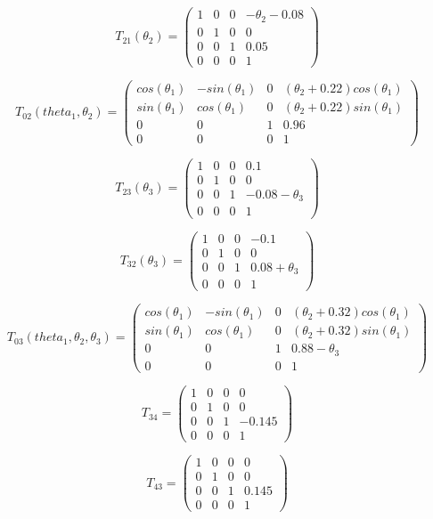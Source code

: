 \documentclass[]{scrreprt}
\begin{document}
\[
T_{21}(\theta_2) = \left(\begin{array}{cccc}
1 & 0 & 0 & -\theta_2-0.08\\
0 & 1 & 0 & 0\\
0 & 0 & 1 & 0.05\\
0 & 0 & 0 & 1
\end{array}\right)
\]

\[
T_{02}(theta_1, \theta_2) = \left(\begin{array}{cccc}
cos(\theta_1) & -sin(\theta_1) & 0 & (\theta_2+0.22)cos(\theta_1)\\
sin(\theta_1) & cos(\theta_1) & 0 & (\theta_2+0.22)sin(\theta_1)\\
0 & 0 & 1 & 0.96\\
0 & 0 & 0 & 1
\end{array}\right)
\]

\[
T_{23}(\theta_3) = \left(\begin{array}{cccc}
1 & 0 & 0 & 0.1\\
0 & 1 & 0 & 0\\
0 & 0 & 1 & -0.08-\theta_3\\
0 & 0 & 0 & 1
\end{array}\right)
\]

\[
T_{32}(\theta_3) = \left(\begin{array}{cccc}
1 & 0 & 0 & -0.1\\
0 & 1 & 0 & 0\\
0 & 0 & 1 & 0.08+\theta_3\\
0 & 0 & 0 & 1
\end{array}\right)
\]

\[
T_{03}(theta_1, \theta_2, \theta_3) = \left(\begin{array}{cccc}
cos(\theta_1) & -sin(\theta_1) & 0 & (\theta_2+0.32)cos(\theta_1)\\
sin(\theta_1) & cos(\theta_1) & 0 & (\theta_2+0.32)sin(\theta_1)\\
0 & 0 & 1 & 0.88-\theta_3\\
0 & 0 & 0 & 1
\end{array}\right)
\]

\[
T_{34} = \left(\begin{array}{cccc}
1 & 0 & 0 & 0\\
0 & 1 & 0 & 0\\
0 & 0 & 1 & -0.145\\
0 & 0 & 0 & 1
\end{array}\right)
\]

\[
T_{43} = \left(\begin{array}{cccc}
1 & 0 & 0 & 0\\
0 & 1 & 0 & 0\\
0 & 0 & 1 & 0.145\\
0 & 0 & 0 & 1
\end{array}\right)
\]
\end{document}
